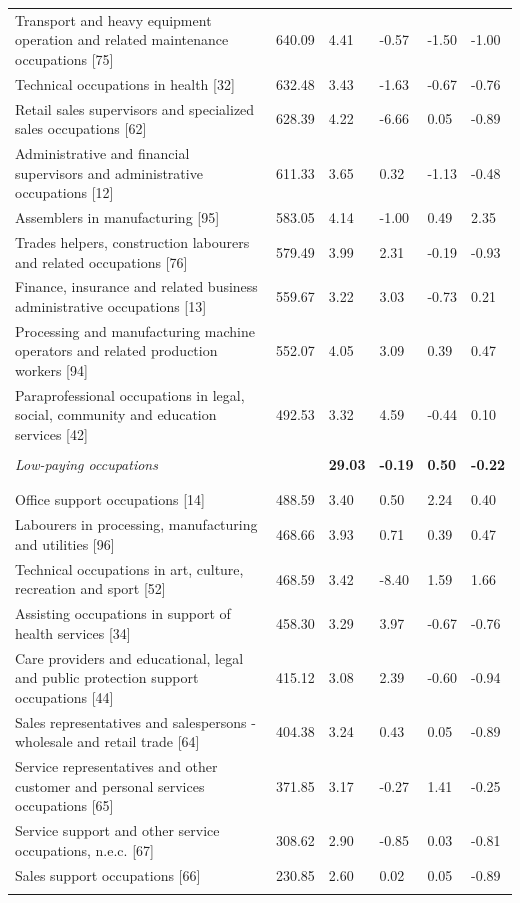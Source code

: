 \documentclass[undefended]{bumrp}
\begin{document}
\begin{table}[!htbp]
\begin{tabular}{p{}p{}p{}p{}p{}p{}}
Transport and heavy equipment operation and related maintenance occupations [75]	& 640.09	& 4.41 &	-0.57 &	-1.50	& -1.00 \\
Technical occupations in health [32]	& 632.48	& 3.43	& -1.63	& -0.67	& -0.76 \\
Retail sales supervisors and specialized sales occupations [62]	& 628.39	& 4.22	& -6.66	& 0.05	& -0.89 \\
Administrative and financial supervisors and administrative occupations [12]	& 611.33	& 3.65	& 0.32	& -1.13 &	-0.48 \\
Assemblers in manufacturing [95]	& 583.05	& 4.14	& -1.00	& 0.49	& 2.35 \\
Trades helpers, construction labourers and related occupations [76]	& 579.49	& 3.99	& 2.31	& -0.19	& -0.93 \\
Finance, insurance and related business administrative occupations [13]	& 559.67	& 3.22	& 3.03	& -0.73 &	0.21 \\
Processing and manufacturing machine operators and related production workers [94]	& 552.07	& 4.05	& 3.09 &	0.39 	& 0.47 \\
Paraprofessional occupations in legal, social, community and education services [42]	& 492.53	& 3.32	& 4.59 &	-0.44	& 0.10 \\
\hline \\[-1.8ex] 
\textit{Low-paying occupations}	& &	\textbf{29.03}	& \textbf{-0.19} & \textbf{0.50} & \textbf{-0.22} \\
\\[-1.8ex]\hline 
\hline \\[-1.8ex] 
Office support occupations [14]	& 488.59	& 3.40 &	0.50	& 2.24	& 0.40 \\
Labourers in processing, manufacturing and utilities [96]	& 468.66	& 3.93	& 0.71	& 0.39	& 0.47 \\
Technical occupations in art, culture, recreation and sport [52]	& 468.59	& 3.42	& -8.40	& 1.59	& 1.66 \\
Assisting occupations in support of health services [34]	& 458.30	& 3.29	& 3.97	& -0.67	& -0.76 \\
Care providers and educational, legal and public protection support occupations [44]	 & 415.12	& 3.08	& 2.39 &	-0.60 &	-0.94 \\
Sales representatives and salespersons - wholesale and retail trade [64]	& 404.38	& 3.24	& 0.43	& 0.05 &	-0.89 \\
Service representatives and other customer and personal services occupations [65]	& 371.85	& 3.17	& -0.27 &	1.41	& -0.25 \\
Service support and other service occupations, n.e.c. [67]	& 308.62	& 2.90	& -0.85	& 0.03	& -0.81 \\
Sales support occupations [66]	& 230.85	& 2.60	& 0.02	& 0.05	& -0.89 \\
\hline 
\hline \\[-1.8ex]  
\end{tabular} 
\end{table} 
\end{document}
